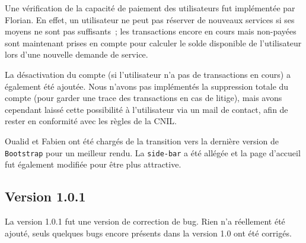 Une vérification de la capacité de paiement des utilisateurs fut implémentée par Florian. En effet, un utilisateur ne peut pas réserver de nouveaux services si ses moyens ne sont pas suffisants~; les transactions encore en cours mais non-payées sont maintenant prises en compte pour calculer le solde disponible de l'utilisateur lors d'une nouvelle demande de service. 

La désactivation du compte (si l'utilisateur n'a pas de transactions en cours) a également été ajoutée. Nous n'avons pas implémentés la suppression totale du compte (pour garder une trace des transactions en cas de litige), mais avons cependant laissé cette possibilité à l'utilisateur via un mail de contact, afin de rester en conformité avec les règles de la CNIL.

Oualid et Fabien ont été chargés de la transition vers la dernière version de \verb|Bootstrap| pour un meilleur rendu. La \verb|side-bar| a été allégée et la page d’accueil fut également modifiée pour être plus attractive.

\subsection{Version 1.0.1}

La version 1.0.1 fut une version de correction de bug. Rien n'a réellement été ajouté, seuls quelques bugs encore présents dans la version 1.0 ont été corrigés.


